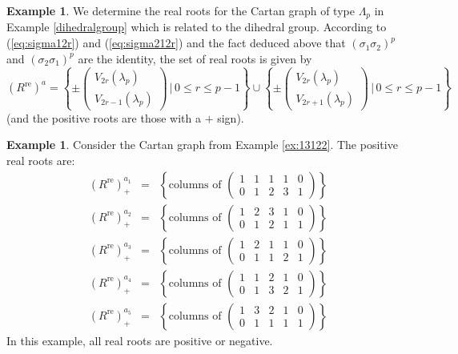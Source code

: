 \documentclass[11pt,a4paper]{amsart}
\theoremstyle{definition}
\newtheorem{Example}[Lemma]{Example}
\numberwithin{equation}{section}
\newcommand{\re }{^\mathrm{re}}
\newcommand{\rer }[1]{(R\re)^{#1}}
\begin{document}
\begin{Example}
We determine the real roots for the Cartan graph 
of type $\Lambda_p$ 
in Example \ref{dihedralgroup} which is related to the 
dihedral group. According to (\ref{eq:sigma12r})
and (\ref{eq:sigma212r}) and the fact deduced above
that 
$(\sigma_1\sigma_2)^p$ and $(\sigma_2\sigma_1)^p$ are 
the identity, the set of real roots is given by 
$$(R^{\mathrm{re}})^a = \left\{ 
\pm \begin{pmatrix} V_{2r}(\lambda_p)
\\ V_{2r-1}(\lambda_p) \end{pmatrix} \,|\,
0\le r\le p-1\right\}
\cup 
\left\{ 
\pm \begin{pmatrix} V_{2r}(\lambda_p)
\\ V_{2r+1}(\lambda_p) \end{pmatrix}\,|\,
0\le r\le p-1\right\}
$$
(and the positive roots are those with a $+$ sign).
\end{Example}



\begin{Example}\label{ex:realroots}
Consider the Cartan graph from Example \ref{ex:13122}. The positive real roots are:
\begin{eqnarray*}
\rer {a_1}_+ &=& \left\{\text{columns of }
\begin{pmatrix}
1 & 1 & 1 & 1 & 0 \\
0 & 1 & 2 & 3 & 1
\end{pmatrix}\right\} \\
\rer {a_2}_+ &=& \left\{\text{columns of }
\begin{pmatrix}
1 & 2 & 3 & 1 & 0 \\
0 & 1 & 2 & 1 & 1
\end{pmatrix}\right\} \\
\rer {a_3}_+ &=& \left\{\text{columns of }
\begin{pmatrix}
1 & 2 & 1 & 1 & 0 \\
0 & 1 & 1 & 2 & 1
\end{pmatrix}\right\} \\
\rer {a_4}_+ &=& \left\{\text{columns of }
\begin{pmatrix}
1 & 1 & 2 & 1 & 0 \\
0 & 1 & 3 & 2 & 1
\end{pmatrix}\right\} \\
\rer {a_5}_+ &=& \left\{\text{columns of }
\begin{pmatrix}
1 & 3 & 2 & 1 & 0 \\
0 & 1 & 1 & 1 & 1
\end{pmatrix}\right\}
\end{eqnarray*}
In this example, all real roots are positive or negative.
\end{Example}
\end{document}
